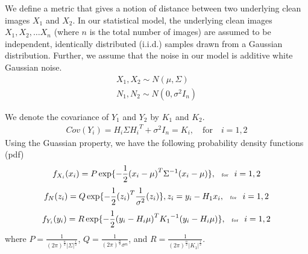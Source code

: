 \documentclass{article}
\begin{document}
We define a metric that gives a notion of distance between two underlying clean images $X_1$ and $X_2$. In our statistical model, the underlying clean images $X_1, X_2, \ldots X_n$ (where $n$ is the total number of images) are assumed to be independent, identically distributed (i.i.d.) samples drawn from a Gaussian distribution. Further, we assume that the noise in our model is additive white Gaussian noise.
\begin{eqnarray} 
X_1, X_2  \sim N( {\mu},\Sigma) \nonumber \\ 
N_1, N_2  \sim N(0,{\sigma}^2 I_n )
\end{eqnarray}

We denote the covariance of $Y_1$ and $Y_2$ by $K_1$ and $K_2$.
\begin{eqnarray}
Cov(Y_i) = H_i \Sigma {H_i}^T + {\sigma}^2 I_n = K_i,\quad \text{for} \quad i=1,2 
\end{eqnarray}
Using the Guassian property, we have the following probability density functions (pdf)
\begin{equation}
\small{
f_{X_i}(x_i) = P \exp\{-\frac{1}{2}{(x_i-\mu)}^T {\Sigma}^{-1}(x_i-\mu)\},\tiny{\quad\text{for}\quad i=1,2 }}
\end{equation}
\begin{equation}
\small{f_N(z_i) = Q \exp\{-\frac{1}{2}{(z_i)}^T \frac{1}{\sigma^2}(z_i)\}, z_i=y_i-H_1 x_i,\tiny{\quad\text{for}\quad i=1,2 }}
\end{equation}
\begin{equation}
\small{f_{Y_i}(y_i) = R \exp\{-\frac{1}{2}{(y_i-H_i\mu)}^T {K_1}^{-1}(y_i-H_i\mu)\},\tiny{\quad\text{for}\quad i=1,2 } }
\end{equation}
where $P=\frac{1}{({2\pi})^{\frac{n}{2}}{|\Sigma|}^{\frac{1}{2}}}$, $Q=\frac{1}{({2\pi})^{\frac{n}{2}}\sigma^n}$, and $R=\frac{1}{({2\pi})^{\frac{n}{2}} {|K_1|}^{\frac{1}{2}}}$.
\end{document}
